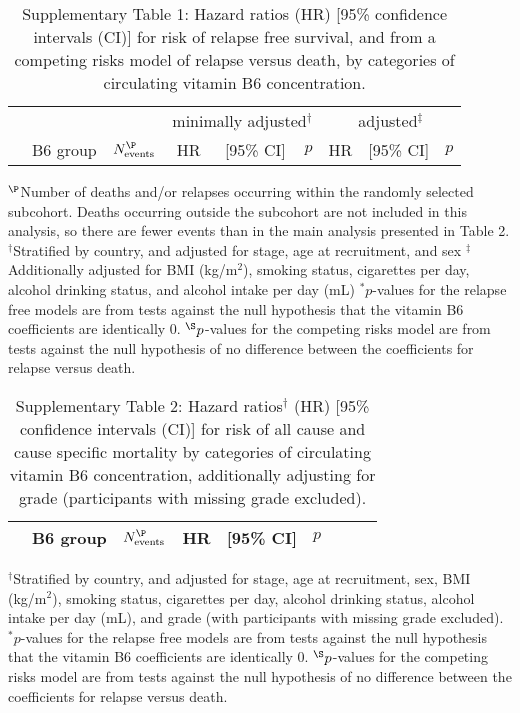 \documentclass[a4paper,10pt]{article}
\begin{document}
\clearpage
\begin{table}
\caption*{Supplementary Table 1: Hazard ratios (HR) [95\% confidence intervals 
(CI)] for risk of 
relapse free survival, and from a competing risks model of relapse versus 
death, by categories of circulating vitamin B6 concentration.}
\begin{tabular}{lrrrrrrrr}
\toprule
& & &\multicolumn{3}{c}{minimally adjusted$^\dag$} & 
\multicolumn{3}{c}{adjusted$^\ddag$} \\
 \cmidrule(r){4-6} \cmidrule(l){7-9} 
& B6 group & $N_{\text{events}}^{\P}$ & HR & [95\% CI] & $p$ & HR & [95\% CI] 
& 
$p$ \\
\midrule

\bottomrule
\end{tabular}
\newline
{\footnotesize 
$^{\P}$Number of deaths and/or relapses occurring within the randomly selected 
subcohort. Deaths occurring outside the subcohort are not included in this 
analysis, so there are fewer events than in the main analysis presented in 
Table 2. \newline
$^\dag$Stratified by country, and adjusted for stage, age at recruitment, and 
sex \newline
$^\ddag$Additionally adjusted for BMI (kg/m$^2$), smoking status, cigarettes 
per day, alcohol drinking status, and alcohol intake per day (mL) \newline
$^*p$-values for the relapse free models are from tests against the null 
hypothesis that the vitamin B6 coefficients are identically 0. \newline
$^{\S}p$-values for the competing risks model are from tests against the null 
hypothesis of no difference between the coefficients for relapse versus death.
}
\end{table}

\begin{table}
\centering
\caption*{Supplementary Table 2: Hazard ratios$^\dag$ (HR) [95\% confidence 
intervals 
(CI)] for risk of all 
cause and cause specific mortality by categories of circulating vitamin B6 
concentration, additionally adjusting for grade (participants with missing 
grade excluded).}
\begin{tabular}{lrrrrrrrr}
\toprule
& B6 group & $N_{\text{events}}^{\P}$ & HR & [95\% CI] & $p$ \\
\midrule

\bottomrule
\end{tabular}
\newline
{\footnotesize 
$^\dag$Stratified by country, and adjusted for stage, age at recruitment, sex, 
BMI (kg/m$^2$), smoking status, cigarettes per day, alcohol drinking status,
alcohol intake per day (mL), and grade (with participants with missing grade 
excluded).\newline
$^*p$-values for the relapse free models are from tests against the null 
hypothesis that the vitamin B6 coefficients are identically 0. \newline
$^{\S}p$-values for the competing risks model are from tests against the null 
hypothesis of no difference between the coefficients for relapse versus death.
}
\end{table}
\clearpage
\end{document}
